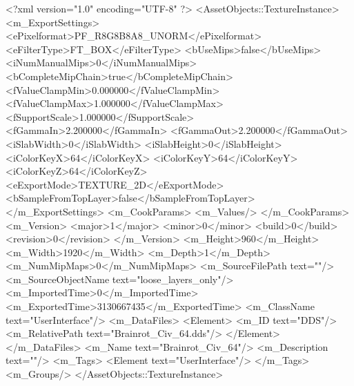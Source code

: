 <?xml version="1.0" encoding="UTF-8" ?>
<AssetObjects::TextureInstance>
	<m_ExportSettings>
		<ePixelformat>PF_R8G8B8A8_UNORM</ePixelformat>
		<eFilterType>FT_BOX</eFilterType>
		<bUseMips>false</bUseMips>
		<iNumManualMips>0</iNumManualMips>
		<bCompleteMipChain>true</bCompleteMipChain>
		<fValueClampMin>0.000000</fValueClampMin>
		<fValueClampMax>1.000000</fValueClampMax>
		<fSupportScale>1.000000</fSupportScale>
		<fGammaIn>2.200000</fGammaIn>
		<fGammaOut>2.200000</fGammaOut>
		<iSlabWidth>0</iSlabWidth>
		<iSlabHeight>0</iSlabHeight>
		<iColorKeyX>64</iColorKeyX>
		<iColorKeyY>64</iColorKeyY>
		<iColorKeyZ>64</iColorKeyZ>
		<eExportMode>TEXTURE_2D</eExportMode>
		<bSampleFromTopLayer>false</bSampleFromTopLayer>
	</m_ExportSettings>
	<m_CookParams>
		<m_Values/>
	</m_CookParams>
	<m_Version>
		<major>1</major>
		<minor>0</minor>
		<build>0</build>
		<revision>0</revision>
	</m_Version>
	<m_Height>960</m_Height>
	<m_Width>1920</m_Width>
	<m_Depth>1</m_Depth>
	<m_NumMipMaps>0</m_NumMipMaps>
	<m_SourceFilePath text=""/>
	<m_SourceObjectName text="loose_layers_only"/>
	<m_ImportedTime>0</m_ImportedTime>
	<m_ExportedTime>3130667435</m_ExportedTime>
	<m_ClassName text="UserInterface"/>
	<m_DataFiles>
		<Element>
			<m_ID text="DDS"/>
			<m_RelativePath text="Brainrot_Civ_64.dds"/>
		</Element>
	</m_DataFiles>
	<m_Name text="Brainrot_Civ_64"/>
	<m_Description text=""/>
	<m_Tags>
		<Element text="UserInterface"/>
	</m_Tags>
	<m_Groups/>
</AssetObjects::TextureInstance>

